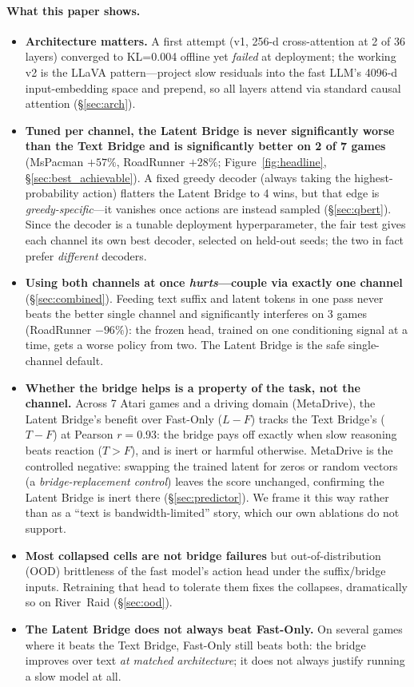 \documentclass[11pt]{article}
\begin{document}
\paragraph{What this paper shows.}
\begin{itemize}[topsep=0pt,itemsep=2pt,leftmargin=*]
\item \textbf{Architecture matters.} A first attempt (v1, 256-d cross-attention at 2 of 36 layers) converged to KL=0.004 offline yet \emph{failed} at deployment; the working v2 is the LLaVA pattern---project slow residuals into the fast LLM's 4096-d input-embedding space and prepend, so all layers attend via standard causal attention (\S\ref{sec:arch}).
\item \textbf{Tuned per channel, the Latent Bridge is never significantly worse than the Text Bridge and is significantly better on 2 of 7 games} (MsPacman $+57\%$, RoadRunner $+28\%$; Figure~\ref{fig:headline}, \S\ref{sec:best_achievable}). A fixed greedy decoder (always taking the highest-probability action) flatters the Latent Bridge to 4 wins, but that edge is \emph{greedy-specific}---it vanishes once actions are instead sampled (\S\ref{sec:qbert}). Since the decoder is a tunable deployment hyperparameter, the fair test gives each channel its own best decoder, selected on held-out seeds; the two in fact prefer \emph{different} decoders.
\item \textbf{Using both channels at once \emph{hurts}---couple via exactly one channel} (\S\ref{sec:combined}). Feeding text suffix and latent tokens in one pass never beats the better single channel and significantly interferes on 3 games (RoadRunner $-96\%$): the frozen head, trained on one conditioning signal at a time, gets a worse policy from two. The Latent Bridge is the safe single-channel default.
\item \textbf{Whether the bridge helps is a property of the task, not the channel.} Across 7 Atari games and a driving domain (MetaDrive), the Latent Bridge's benefit over Fast-Only ($L\!-\!F$) tracks the Text Bridge's ($T\!-\!F$) at Pearson $r=0.93$: the bridge pays off exactly when slow reasoning beats reaction ($T\!>\!F$), and is inert or harmful otherwise. MetaDrive is the controlled negative: swapping the trained latent for zeros or random vectors (a \emph{bridge-replacement control}) leaves the score unchanged, confirming the Latent Bridge is inert there (\S\ref{sec:predictor}). We frame it this way rather than as a ``text is bandwidth-limited'' story, which our own ablations do not support.
\item \textbf{Most collapsed cells are not bridge failures} but out-of-distribution (OOD) brittleness of the fast model's action head under the suffix/bridge inputs. Retraining that head to tolerate them fixes the collapses, dramatically so on River~Raid (\S\ref{sec:ood}).
\item \textbf{The Latent Bridge does not always beat Fast-Only.} On several games where it beats the Text Bridge, Fast-Only still beats both: the bridge improves over text \emph{at matched architecture}; it does not always justify running a slow model at all.
\end{itemize}
\end{document}
